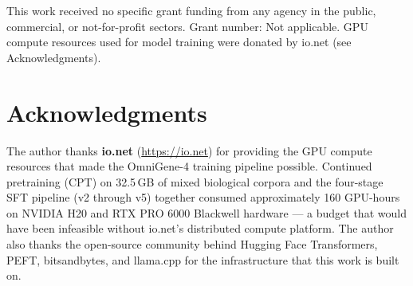 \documentclass[11pt]{article}
\begin{document}
This work received no specific grant funding from any agency in the public, commercial, or not-for-profit sectors. Grant number: Not applicable. GPU compute resources used for model training were donated by io.net (see Acknowledgments).

\section*{Acknowledgments}

The author thanks \textbf{io.net} (\url{https://io.net}) for providing the GPU compute resources that made the OmniGene-4 training pipeline possible. Continued pretraining (CPT) on 32.5\,GB of mixed biological corpora and the four-stage SFT pipeline (v2 through v5) together consumed approximately 160 GPU-hours on NVIDIA H20 and RTX PRO 6000 Blackwell hardware --- a budget that would have been infeasible without io.net's distributed compute platform. The author also thanks the open-source community behind Hugging Face Transformers, PEFT, bitsandbytes, and llama.cpp for the infrastructure that this work is built on.



\end{document}
